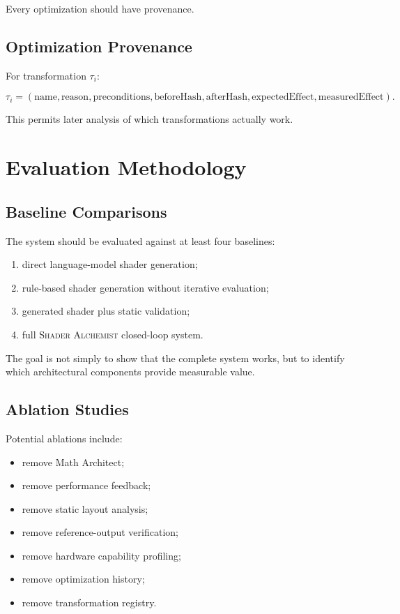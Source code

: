 \documentclass[11pt,a4paper,oneside]{report}
\newcommand{\SA}{\textsc{Shader Alchemist}}
\begin{document}
Every optimization should have provenance.

\section{Optimization Provenance}

For transformation $\tau_i$:

\begin{equation}
\tau_i=
(
\mathrm{name},
\mathrm{reason},
\mathrm{preconditions},
\mathrm{beforeHash},
\mathrm{afterHash},
\mathrm{expectedEffect},
\mathrm{measuredEffect}
).
\end{equation}

This permits later analysis of which transformations actually work.

\chapter{Evaluation Methodology}

\section{Baseline Comparisons}

The system should be evaluated against at least four baselines:

\begin{enumerate}
  \item direct language-model shader generation;
  \item rule-based shader generation without iterative evaluation;
  \item generated shader plus static validation;
  \item full \SA{} closed-loop system.
\end{enumerate}

The goal is not simply to show that the complete system works, but to identify which architectural
components provide measurable value.

\section{Ablation Studies}

Potential ablations include:

\begin{itemize}
  \item remove Math Architect;
  \item remove performance feedback;
  \item remove static layout analysis;
  \item remove reference-output verification;
  \item remove hardware capability profiling;
  \item remove optimization history;
  \item remove transformation registry.
\end{itemize}
\end{document}
